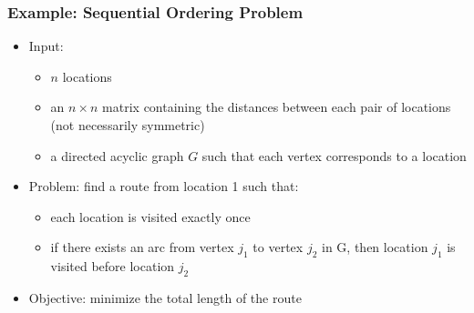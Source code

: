 \documentclass[10pt]{beamer}
\begin{document}
\begin{frame}
  \frametitle{Example: Sequential Ordering Problem}

  \begin{itemize}
    \item Input:
      \begin{itemize}
        \item $n$ locations
        \item an $n \times n$ matrix containing the distances between each pair of locations (not necessarily symmetric)
        \item a directed acyclic graph $G$ such that each vertex corresponds to a location
      \end{itemize}
    \item Problem: find a route from location 1 such that:
      \begin{itemize}
        \item each location is visited exactly once
        \item if there exists an arc from vertex $j_1$ to vertex $j_2$ in G, then location $j_1$ is visited before location $j_2$
      \end{itemize}
    \item Objective: minimize the total length of the route
  \end{itemize}
\end{frame}
\end{document}
